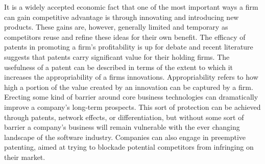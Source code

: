 It is a widely accepted economic fact that one of the most important ways a firm can gain competitive advantage is through innovating and introducing new products.
These gains are, however, generally limited and temporary as competitors reuse and refine these ideas for their own benefit.\autocite[81]{ceccagnoli2007appropriability}
The efficacy of patents in promoting a firm's profitability is up for debate and recent literature suggests that patents carry significant value for their holding firms.\autocite[]{ceccagnoli2007appropriability}
The usefulness of a patent can be described in terms of the extent to which it increases the appropriability of a firms innovations.\autocite[81]{ceccagnoli2007appropriability}
Appropriability refers to how high a portion of the value created by an innovation can be captured by a firm.\autocite[82]{ceccagnoli2007appropriability}
Erecting some kind of barrier around core business technologies can dramatically improve a company's long-term prospects.\autocite[]{HorizontalPlaysTechnology}
This sort of protection can be achieved through patents, network effects, or differentiation, but without some sort of barrier a company's business will remain vulnerable with the ever changing landscape of the software industry.\autocite[]{HorizontalPlaysTechnology}
Companies can also engage in preemptive patenting, aimed at trying to blockade potential competitors from infringing on their market.\autocite[83]{ceccagnoli2007appropriability}


